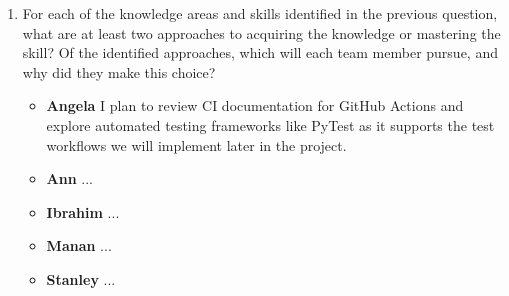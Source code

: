 \documentclass[12pt, titlepage]{article}
\begin{document}
\begin{enumerate}
  \item For each of the knowledge areas and skills identified in the previous
  question, what are at least two approaches to acquiring the knowledge or
  mastering the skill?  Of the identified approaches, which will each team
  member pursue, and why did they make this choice?
  \begin{itemize}
      \item \textbf{Angela} I plan to review CI documentation for GitHub Actions and explore automated testing frameworks like PyTest as it supports the test workflows we will implement later in the project.
      \item \textbf{Ann} ...
      \item \textbf{Ibrahim} ...
      \item \textbf{Manan} ...
      \item \textbf{Stanley} ...
    \end{itemize}
\end{enumerate}
\end{document}
